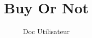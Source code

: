 \documentclass{BetterDocument}
\title{Buy Or Not}
\subtitle{Doc Utilisateur}
\date{}
\begin{document}
\pageDeGarde

\tableDesMatieres


\end{document}
